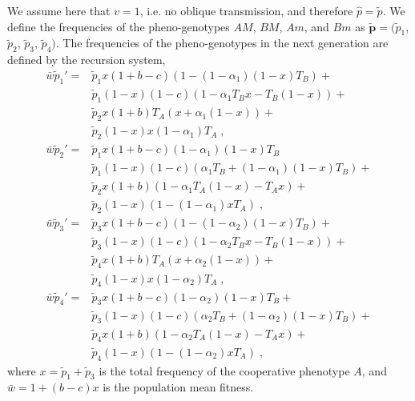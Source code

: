 \documentclass[12pt]{extarticle}
\let\vec\mathbf
\begin{document}
\begin{appendices}
We assume here that $v=1$, i.e. no oblique transmission, and therefore $\hat{p}=\tilde{p}$.
We define the frequencies of the pheno-genotypes $AM$, $BM$, $Am$, and $Bm$ as $\vec{\tilde{p}}= (\tilde{p}_1$, $\tilde{p}_2$, $\tilde{p}_3$, $\tilde{p}_4)$. 
The frequencies of the pheno-genotypes in the next generation are defined by the recursion system, 
\begin{equation} \label{eq:next_gen_p_1}
  \begin{aligned}
  \bar{w}\tilde{p}_1' = 
  & \tilde{p}_1 x (1+b-c)(1 - (1-\alpha_1)(1-x)T_B) + \\
  & \tilde{p}_1(1-x)(1-c)(1-\alpha_1T_B x - T_B(1-x)) + \\
  & \tilde{p}_2 x (1+b)T_A(x + \alpha_1(1-x)) + \\
  & \tilde{p}_2(1-x)x(1-\alpha_1)T_A \;,
\\
  \bar{w}\tilde{p}_2' = 
  & \tilde{p}_1 x (1+b-c)(1-\alpha_1)(1-x)T_B \\
  & \tilde{p}_1(1-x)(1-c)(\alpha_1 T_B + (1-\alpha_1)(1-x)T_B) + \\
  & \tilde{p}_2 x (1+b)(1-\alpha_1 T_A(1-x) - T_A x) + \\
& \tilde{p}_2(1-x)(1 - (1-\alpha_1) x T_A) \;, 
\\
  \bar{w}\tilde{p}_3' =
  & \tilde{p}_3 x (1+b-c)(1 - (1-\alpha_2)(1-x)T_B) + \\
  & \tilde{p}_3(1-x)(1-c)(1-\alpha_2 T_B x - T_B(1-x)) + \\
  & \tilde{p}_4 x (1+b)T_A(x + \alpha_2 (1-x)) + \\
  & \tilde{p}_4(1-x) x (1-\alpha_2)T_A \;, 
\\
  \bar{w}\tilde{p}_4' =
  & \tilde{p}_3 x (1+b-c)(1-\alpha_2)(1-x)T_B + \\
  & \tilde{p}_3(1-x)(1-c)(\alpha_2 T_B + (1-\alpha_2)(1-x)T_B) + \\
  & \tilde{p}_4 x (1+b)(1-\alpha_2T_A(1-x)-T_A x ) + \\
  & \tilde{p}_4(1-x)(1 - (1-\alpha_2) x T_A) \;,
  \end{aligned}
\end{equation}
where $x=\tilde{p}_1+\tilde{p}_3$ is the total frequency of the cooperative phenotype $A$, and $\bar{w} = 1 + (b-c) x$ is the population mean fitness.%


\end{appendices}
\end{document}
